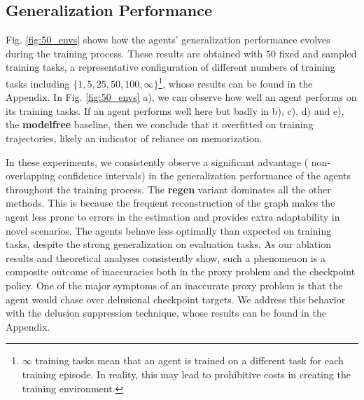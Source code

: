 \subsection{Generalization Performance}
Fig. \ref{fig:50_envs} shows how the agents' generalization performance evolves during the training process. These results are obtained with $50$ fixed and sampled training tasks, a representative configuration of different numbers of training tasks including $\{1, 5, 25, 50, 100, \infty \}$\footnote{$\infty$ training tasks mean that an agent is trained on a different  task for each training episode. In reality, this may lead to prohibitive costs in creating the training environment.}, whose results can be found in the Appendix. In Fig. \ref{fig:50_envs} a), we can observe how well an agent performs on its training tasks. If an agent performs well here but badly in b), c), d) and e), \eg{} the \textbf{modelfree} baseline, then we conclude that it overfitted on training trajectories, likely an indicator of reliance on memorization.

In these experiments, we consistently observe a significant advantage (\ie{} non-overlapping confidence intervals) in the generalization performance of the \agentshort{} agents throughout the training process. The \textbf{regen} variant dominates all the other methods. This is because the frequent reconstruction of the graph makes the agent less prone to errors in the estimation and provides extra adaptability in novel scenarios. The \agentshort{} agents behave less optimally than expected on training tasks, despite the strong generalization on evaluation tasks. As our ablation results and theoretical analyses consistently show, such a phenomenon is a composite outcome of inaccuracies both in the proxy problem and the checkpoint policy. One of the major symptoms of an inaccurate proxy problem is that the agent would chase over delusional checkpoint targets. We address this behavior with the delusion suppression technique, whose results can be found in the Appendix.

